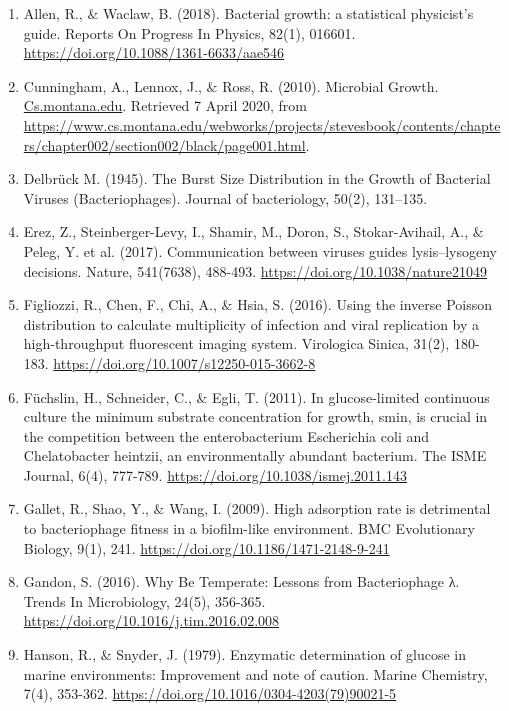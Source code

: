 \documentclass{article}
\begin{document}
\begin{enumerate}
\item	Allen, R., $\&$ Waclaw, B. (2018). Bacterial growth: a statistical physicist’s guide. Reports On Progress In Physics, 82(1), 016601.
\url{https://doi.org/10.1088/1361-6633/aae546}

\item	Cunningham, A., Lennox, J., $\&$ Ross, R. (2010). Microbial Growth. \url{Cs.montana.edu}. Retrieved 7 April 2020, from \url{https://www.cs.montana.edu/webworks/projects/stevesbook/contents/chapters/chapter002/section002/black/page001.html}.

\item	Delbrück M. (1945). The Burst Size Distribution in the Growth of Bacterial Viruses (Bacteriophages). Journal of bacteriology, 50(2), 131–135. 

\item	Erez, Z., Steinberger-Levy, I., Shamir, M., Doron, S., Stokar-Avihail, A., $\&$ Peleg, Y. et al. (2017). Communication between viruses guides lysis–lysogeny decisions. Nature, 541(7638), 488-493. \url{https://doi.org/10.1038/nature21049}

\item	Figliozzi, R., Chen, F., Chi, A., $\&$ Hsia, S. (2016). Using the inverse Poisson distribution to calculate multiplicity of infection and viral replication by a high-throughput fluorescent imaging system. Virologica Sinica, 31(2), 180-183. \url{https://doi.org/10.1007/s12250-015-3662-8} 

\item	Füchslin, H., Schneider, C., $\&$ Egli, T. (2011). In glucose-limited continuous culture the minimum substrate concentration for growth, smin, is crucial in the competition between the enterobacterium Escherichia coli and Chelatobacter heintzii, an environmentally abundant bacterium. The ISME Journal, 6(4), 777-789. \url{https://doi.org/10.1038/ismej.2011.143}

\item	Gallet, R., Shao, Y., $\&$ Wang, I. (2009). High adsorption rate is detrimental to bacteriophage fitness in a biofilm-like environment. BMC Evolutionary Biology, 9(1), 241. \url{https://doi.org/10.1186/1471-2148-9-241} 

\item	Gandon, S. (2016). Why Be Temperate: Lessons from Bacteriophage λ. Trends In Microbiology, 24(5), 356-365. \url{https://doi.org/10.1016/j.tim.2016.02.008}

\item	Hanson, R., $\&$ Snyder, J. (1979). Enzymatic determination of glucose in marine environments: Improvement and note of caution. Marine Chemistry, 7(4), 353-362. \url{https://doi.org/10.1016/0304-4203(79)90021-5} 


\end{enumerate}
\end{document}
